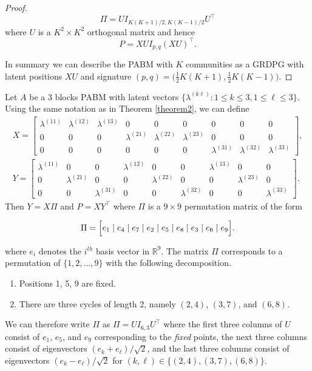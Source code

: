 \documentclass[12pt]{article}
\begin{document}
\begin{proof}
\begin{equation} \label{eq:permutation}
\Pi = U I_{K (K + 1) / 2, K (K - 1) / 2} U^\top
\end{equation}
where $U$ is a $K^2 \times K^2$ orthogonal matrix and hence
\begin{equation} \label{eq:pabm-grdpg}
P = X U I_{p, q} (X U)^\top.
\end{equation}

In summary we can describe the PABM with $K$ communities as a GRDPG with latent
positions $X U$ and signature $(p,q) = \bigl( \tfrac{1}{2} K (K + 1) ,
\tfrac{1}{2} K (K - 1)\bigr)$.
\end{proof}

\begin{example} Let $A$ be a $3$ blocks PABM with latent vectors
  $\{\lambda^{(k \ell)} \colon 1 \leq k \leq 3, 1 \leq \ell \leq 3\}$. Using the same notation as in Theorem
  \ref{theorem2}, we can define
\begin{gather*}
X = \begin{bmatrix}
\lambda^{(11)} & \lambda^{(12)} & \lambda^{(13)} & 0 & 0 & 0 & 0 & 0 & 0 \\
0 & 0 & 0 & \lambda^{(21)} & \lambda^{(22)} & \lambda^{(23)} & 0 & 0 & 0 \\
0 & 0 & 0 & 0 & 0 & 0 & \lambda^{(31)} & \lambda^{(32)} & \lambda^{(33)}
\end{bmatrix}, \\
Y = \begin{bmatrix}
\lambda^{(11)} & 0 & 0 & \lambda^{(12)} & 0 & 0 & \lambda^{(13)} & 0 & 0 \\
0 & \lambda^{(21)} & 0 & 0 & \lambda^{(22)} & 0 & 0 & \lambda^{(23)} & 0 \\
0 & 0 & \lambda^{(31)} & 0 & 0 & \lambda^{(32)} & 0 & 0 & \lambda^{(33)}
\end{bmatrix}.
\end{gather*}
Then $Y = X \Pi$ and $P = X Y^{\top}$ where $\Pi$ is a $9 \times 9$ 
permutation matrix of the form

$$\Pi = 
\Bigl[e_1 \mid e_4 \mid e_7 \mid e_2 \mid e_5 \mid e_8 \mid e_3
\mid e_6 \mid e_9 \Bigr].$$

where $e_i$ denotes the $i^{th}$ basis vector in $\mathbb{R}^{9}$. 
The matrix $\Pi$ corresponds to a permutation of $\{1,2,\dots,9\}$
with the following decomposition.
\begin{enumerate}
\item Positions 1, 5, 9 are fixed.
\item There are three cycles of length 2, namely $(2, 4)$, $(3, 7)$, and $(6, 8)$.
\end{enumerate}
We can therefore write $\Pi$ as $\Pi = U I_{6, 3} U^\top$ where the first three
columns of $U$ consist of $e_1$, $e_5$, and $e_9$ corresponding to the
{\em fixed} points, the next three columns consist of eigenvectors
$(e_k + e_{\ell}) / \sqrt{2}$, and the last three columns consist of eigenvectors
$(e_k - e_{\ell}) / \sqrt{2}$ for $(k, \ell) \in
\{(2,4),(3,7),(6,8)\}$.


\end{example}
\end{document}
